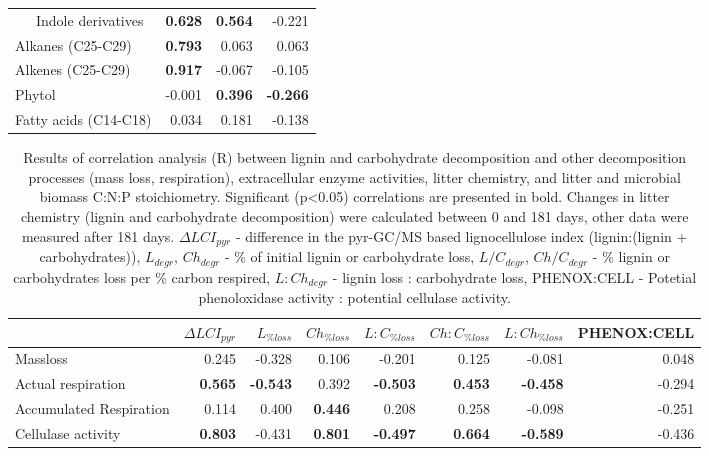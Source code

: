\documentclass[10pt]{article}
\begin{document}
\begin{flushleft}
\begin{table}[h!]
{\begin{tabular}{lrrr}
  \ \ \ Indole derivatives & \textbf{ 0.628 } & \textbf{ 0.564 } & -0.221 \\ 
  Alkanes (C25-C29) & \textbf{ 0.793 } & 0.063 & 0.063 \\ 
  Alkenes (C25-C29) & \textbf{ 0.917 } & -0.067 & -0.105 \\ 
  Phytol & -0.001 & \textbf{ 0.396 } & \textbf{ -0.266 } \\ 
  Fatty acids (C14-C18) & 0.034 & 0.181 & -0.138 \\ 
   \hline
\end{tabular}
}
\end{table}


\begin{landscape}

\begin{table}[h!]
\centering
\caption{Results of correlation analysis (R) between lignin and carbohydrate decomposition and other decomposition processes (mass loss, respiration), extracellular enzyme activities, litter chemistry, and litter and microbial biomass C:N:P stoichiometry. Significant (p\textless 0.05) correlations are presented in bold. Changes in litter chemistry (lignin and carbohydrate decomposition) were calculated between 0 and 181 days, other data were measured after 181 days. $\Delta LCI_{pyr}$ - difference in the pyr-GC/MS based lignocellulose index (lignin:(lignin + carbohydrates)), $L_{degr}$, $Ch_{degr}$ - \% of initial lignin or carbohydrate loss, $L/C_{degr}$, $Ch/C_{degr}$  - \% lignin or carbohydrates loss per \% carbon respired, $L:Ch_{degr}$ - lignin loss : carbohydrate loss, PHENOX:CELL - Potetial phenoloxidase activity : potential cellulase activity.} 
\label{corrtable}
{\small
\begin{tabular}{lrrrrrrr}
  \hline
 & $\Delta LCI_{pyr}$ & $L_{\%loss}$ & $Ch_{\%loss}$ & $L:C_{\%loss}$ & $Ch:C_{\%loss}$ & $L:Ch_{\%loss}$ & PHENOX:CELL \\ 
  \hline
Massloss & 0.245 & -0.328 & 0.106 & -0.201 & 0.125 & -0.081 & 0.048 \\ 
  Actual respiration & \textbf{ 0.565 } & \textbf{ -0.543 } & 0.392 & \textbf{ -0.503 } & \textbf{ 0.453 } & \textbf{ -0.458 } & -0.294 \\ 
  Accumulated Respiration & 0.114 & 0.400 & \textbf{ 0.446 } & 0.208 & 0.258 & -0.098 & -0.251 \\ 
  Cellulase activity & \textbf{ 0.803 } & -0.431 & \textbf{ 0.801 } & \textbf{ -0.497 } & \textbf{ 0.664 } & \textbf{ -0.589 } & -0.436 \\ 

\end{tabular}}
\end{table}
\end{landscape}
\end{flushleft}
\end{document}
